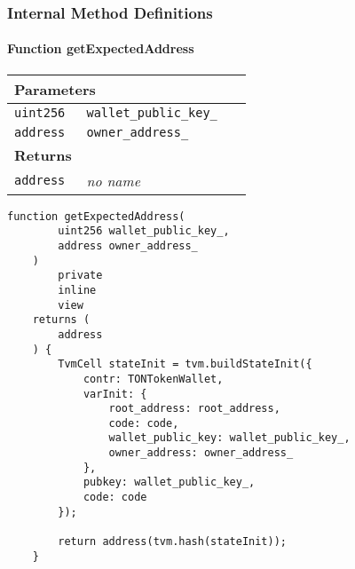 \subsubsection{Internal Method Definitions}


\paragraph{Function getExpectedAddress}


\ifsoltables
\noindent\begin{tabular}{|l|l|p{5cm}|}\hline
\multicolumn{3}{|l|}{\bf Parameters}\\\hline
\tt uint256 & \tt wallet\_{}public\_{}key\_{} &\\\hline
\tt address & \tt owner\_{}address\_{} &\\\hline
\multicolumn{3}{|l|}{\bf Returns}\\\hline
\tt address & {\em no name} &\\\hline
\end{tabular}
\fi

\vspace{2cm}

\begin{lstlisting}[firstnumber=620]
    function getExpectedAddress(
        uint256 wallet_public_key_,
        address owner_address_
    )
        private
        inline
        view
    returns (
        address
    ) {
        TvmCell stateInit = tvm.buildStateInit({
            contr: TONTokenWallet,
            varInit: {
                root_address: root_address,
                code: code,
                wallet_public_key: wallet_public_key_,
                owner_address: owner_address_
            },
            pubkey: wallet_public_key_,
            code: code
        });

        return address(tvm.hash(stateInit));
    }
\end{lstlisting}
